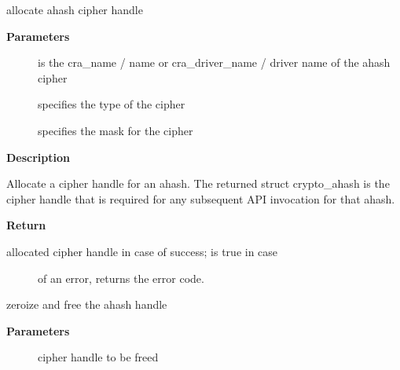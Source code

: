 \documentclass[a4paper,8pt,english]{sphinxmanual}
\begin{document}
\begin{fulllineitems}
\label{crypto/api-digest:c.crypto_alloc_ahash}
allocate ahash cipher handle

\end{fulllineitems}


\textbf{Parameters}
\begin{description}
\item[{}] \leavevmode
is the cra\_name / name or cra\_driver\_name / driver name of the
ahash cipher

\item[{}] \leavevmode
specifies the type of the cipher

\item[{}] \leavevmode
specifies the mask for the cipher

\end{description}

\textbf{Description}

Allocate a cipher handle for an ahash. The returned struct
crypto\_ahash is the cipher handle that is required for any subsequent
API invocation for that ahash.

\textbf{Return}
\begin{description}
\item[{allocated cipher handle in case of success;  is true in case}] \leavevmode
of an error,  returns the error code.

\end{description}

\begin{fulllineitems}
\label{crypto/api-digest:c.crypto_free_ahash}
zeroize and free the ahash handle

\end{fulllineitems}


\textbf{Parameters}
\begin{description}
\item[{}] \leavevmode
cipher handle to be freed

\end{description}
\end{document}
